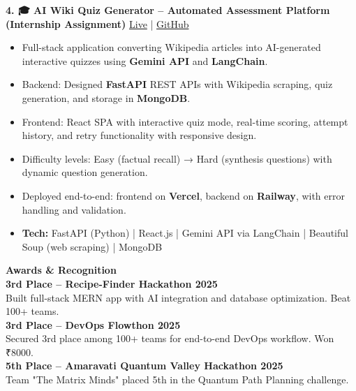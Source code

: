 \documentclass[9pt,a4paper]{article}
\begin{document}
\begin{tcolorbox}[enhanced,sharp corners,colback=white,boxrule=0pt,frame hidden,
borderline south={0.9pt}{0pt}{black!50}]
\textbf{4. 🎓 AI Wiki Quiz Generator – Automated Assessment Platform (Internship Assignment)} \hfill
\href{https://ai-wiki-quiz.vercel.app}{Live} | 
\href{https://github.com/hanuman2005/ai-wiki-quiz}{GitHub}
\begin{itemize}[topsep=1pt]
  \item Full-stack application converting Wikipedia articles into AI-generated interactive quizzes using \textbf{Gemini API} and \textbf{LangChain}.
  \item Backend: Designed \textbf{FastAPI} REST APIs with Wikipedia scraping, quiz generation, and storage in \textbf{MongoDB}.
  \item Frontend: React SPA with interactive quiz mode, real-time scoring, attempt history, and retry functionality with responsive design.
  \item Difficulty levels: Easy (factual recall) → Hard (synthesis questions) with dynamic question generation.
  \item Deployed end-to-end: frontend on \textbf{Vercel}, backend on \textbf{Railway}, with error handling and validation.
  \item \textbf{Tech:} FastAPI (Python) | React.js | Gemini API via LangChain | Beautiful Soup (web scraping) | MongoDB
\end{itemize}

\end{tcolorbox}

\begin{tcolorbox}[enhanced,sharp corners,colback=white,boxrule=0pt,frame hidden,
borderline south={0.5pt}{0pt}{black!50}]
\textbf{Awards \& Recognition} \\[0.5ex]
\textbf{3rd Place – Recipe-Finder Hackathon 2025} \\
Built full-stack MERN app with AI integration and database optimization. Beat 100+ teams. \\[0.25ex]
\textbf{3rd Place – DevOps Flowthon 2025} \\
Secured 3rd place among 100+ teams for end-to-end DevOps workflow. Won ₹8000. \\[0.25ex]
\textbf{5th Place – Amaravati Quantum Valley Hackathon 2025} \\
Team "The Matrix Minds" placed 5th in the Quantum Path Planning challenge.
\end{tcolorbox}
\end{document}
